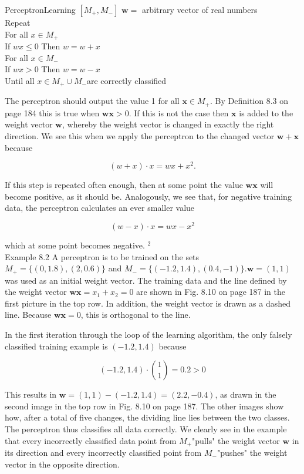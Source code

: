 \documentclass[10pt]{book}
\begin{document}
PerceptronLearning $\left[M_{+}, M_{-}\right]$ $\boldsymbol{w}=$ arbitrary vector of real numbers\\
Repeat\\
For all $x \in M_{+}$\\
If $w x \leq 0$ Then $w=w+x$\\
For all $x \in M_{-}$\\
If $w x>0$ Then $w=w-x$\\
Until all $x \in M_{+} \cup M_{-}$are correctly classified

The perceptron should output the value 1 for all $\boldsymbol{x} \in M_{+}$. By Definition 8.3 on page 184 this is true when $\boldsymbol{w} \boldsymbol{x}>0$. If this is not the case then $\boldsymbol{x}$ is added to the weight vector $\boldsymbol{w}$, whereby the weight vector is changed in exactly the right direction. We see this when we apply the perceptron to the changed vector $\boldsymbol{w}+\boldsymbol{x}$ because

$$
(w+x) \cdot x=w x+x^{2} .
$$

If this step is repeated often enough, then at some point the value $\boldsymbol{w} \boldsymbol{x}$ will become positive, as it should be. Analogously, we see that, for negative training data, the perceptron calculates an ever smaller value

$$
(w-x) \cdot x=w x-x^{2}
$$

which at some point becomes negative. ${ }^{2}$\\
Example 8.2 A perceptron is to be trained on the sets $M_{+}=\{(0,1.8),(2,0.6)\}$ and $M_{-}=\{(-1.2,1.4),(0.4,-1)\} . \boldsymbol{w}=(1,1)$ was used as an initial weight vector. The training data and the line defined by the weight vector $\boldsymbol{w} \boldsymbol{x}=x_{1}+x_{2}=0$ are shown in Fig. 8.10 on page 187 in the first picture in the top row. In addition, the weight vector is drawn as a dashed line. Because $\boldsymbol{w} \boldsymbol{x}=0$, this is orthogonal to the line.

In the first iteration through the loop of the learning algorithm, the only falsely classified training example is $(-1.2,1.4)$ because

$$
(-1.2,1.4) \cdot\binom{1}{1}=0.2>0
$$

This results in $\boldsymbol{w}=(1,1)-(-1.2,1.4)=(2.2,-0.4)$, as drawn in the second image in the top row in Fig. 8.10 on page 187. The other images show how, after a total of five changes, the dividing line lies between the two classes. The perceptron thus classifies all data correctly. We clearly see in the example that every incorrectly classified data point from $M_{+}$"pulls" the weight vector $\boldsymbol{w}$ in its direction and every incorrectly classified point from $M_{-}$"pushes" the weight vector in the opposite direction.
\end{document}
